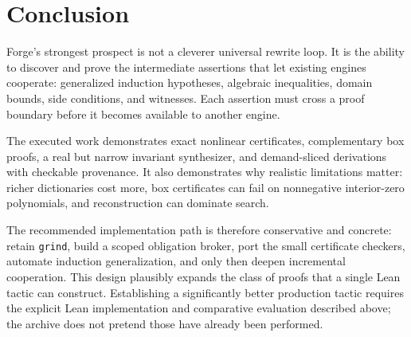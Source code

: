 \documentclass[11pt,a4paper]{article}
\newcommand{\grind}{\texttt{grind}}
\begin{document}
\section{Conclusion}
Forge's strongest prospect is not a cleverer universal rewrite loop. It is the ability to discover and prove the intermediate assertions that let existing engines cooperate: generalized induction hypotheses, algebraic inequalities, domain bounds, side conditions, and witnesses. Each assertion must cross a proof boundary before it becomes available to another engine.

The executed work demonstrates exact nonlinear certificates, complementary box proofs, a real but narrow invariant synthesizer, and demand-sliced derivations with checkable provenance. It also demonstrates why realistic limitations matter: richer dictionaries cost more, box certificates can fail on nonnegative interior-zero polynomials, and reconstruction can dominate search.

The recommended implementation path is therefore conservative and concrete: retain \grind{}, build a scoped obligation broker, port the small certificate checkers, automate induction generalization, and only then deepen incremental cooperation. This design plausibly expands the class of proofs that a single Lean tactic can construct. Establishing a significantly better production tactic requires the explicit Lean implementation and comparative evaluation described above; the archive does not pretend those have already been performed.

\appendix
\end{document}
